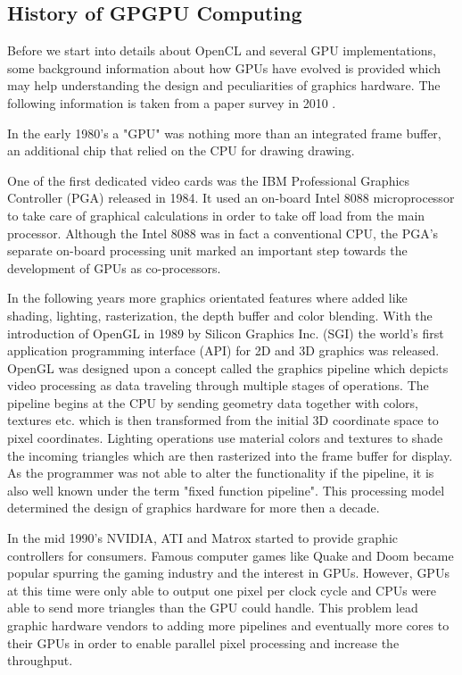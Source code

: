 \subsection{History of GPGPU Computing} 
\label{sec:history}
Before we start into details about OpenCL and several GPU implementations, some background information about how GPUs have evolved is provided which may help understanding the design and peculiarities of graphics hardware. The following information is taken from a paper survey in 2010 \cite{gpu_history}.

In the early 1980's a "GPU" was nothing more than an integrated frame buffer, an additional chip that relied on the CPU for drawing drawing.

One of the first dedicated video cards was the IBM Professional Graphics Controller (PGA) released in 1984. It used an on-board Intel 8088 microprocessor to take care of graphical calculations in order to take off load from the main processor. Although the Intel 8088 was in fact a conventional CPU, the PGA's separate on-board processing unit marked an important step towards the development of GPUs as co-processors.

In the following years more graphics orientated features where added like shading, lighting, rasterization, the depth buffer and color blending. With the introduction of OpenGL in 1989 by Silicon Graphics Inc. (SGI) the world's first application programming interface (API) for 2D and 3D graphics was released. OpenGL was designed upon a concept called the graphics pipeline which depicts video processing as data traveling through multiple stages of operations. The pipeline begins at the CPU by sending geometry data together with colors, textures etc. which is then transformed from the initial 3D coordinate space to pixel coordinates. Lighting operations use material colors and textures to shade the incoming triangles which are then rasterized into the frame buffer for display. As the programmer was not able to alter the functionality if the pipeline, it is also well known under the term "fixed function pipeline". This processing model determined the design of graphics hardware for more then a decade.

In the mid 1990's NVIDIA, ATI and Matrox started to provide graphic controllers for consumers. Famous computer games like Quake and Doom became popular spurring the gaming industry and the interest in GPUs. However, GPUs at this time were only able to output one pixel per clock cycle and CPUs were able to send more triangles than the GPU could handle. This problem lead graphic hardware vendors to adding more pipelines and eventually more cores to their GPUs in order to enable parallel pixel processing and increase the throughput.


